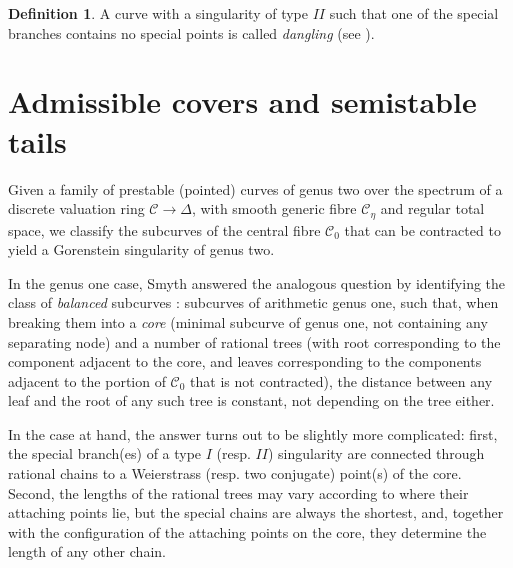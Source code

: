 \documentclass{compositio}
\renewcommand{\to}{\rightarrow}
\newcommand{\dvr}{\Delta}
\theoremstyle{plain}
\theoremstyle{definition}
\newtheorem{definition}[thm]{Definition}
\theoremstyle{remark}
\begin{document}
\begin{definition}\label{def:dangling}
 A curve with a singularity of type $I\!I$ such that one of the special branches contains no special points is called \emph{dangling} (see \cite[\S 2.1]{AFSGm}).
\end{definition}


\section{Admissible covers and semistable tails}\label{sec:sstails}

Given a family of prestable (pointed) curves of genus two over the spectrum of a discrete valuation ring $\mathcal C\to\dvr$, with smooth generic fibre $\mathcal C_{\eta}$ and regular total space, we classify the subcurves of the central fibre $\mathcal C_{0}$ that can be contracted to yield a Gorenstein singularity of genus two. 

In the genus one case, Smyth answered the analogous question by identifying the class of \emph{balanced} subcurves \cite[Definition 2.11]{SMY1}: subcurves of arithmetic genus one, such that, when breaking them into a \emph{core} (minimal subcurve of genus one, not containing any separating node) and a number of rational trees (with root corresponding to the component adjacent to the core, and leaves corresponding to the components adjacent to the portion of $\mathcal C_0$ that is not contracted), the distance between any leaf and the root of any such tree is constant, not depending on the tree either.

In the case at hand, the answer turns out to be slightly more complicated: first, the special branch(es) of a type $I$ (resp. $I\!I$) singularity are connected through rational chains to a Weierstrass (resp. two conjugate) point(s) of the core. Second, the lengths of the rational trees may vary according to where their attaching points lie, but the special chains are always the shortest, and, together with the configuration of the attaching points on the core, they determine the length of any other chain.
\end{document}
